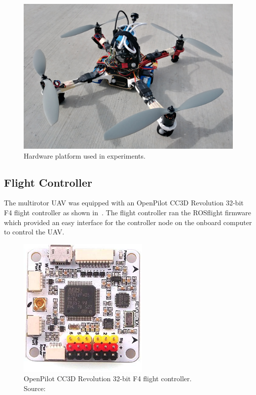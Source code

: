 \begin{figure}[htbp]
  \centering
  \includegraphics[scale=0.15]{figures/hardware_platform.jpg}
  \caption[Multirotor UAV Used in Experiments]{Hardware platform used in experiments.}
  \label{f:drone_pic}
\end{figure}

\subsection{Flight Controller}
The multirotor UAV was equipped with an OpenPilot CC3D Revolution 32-bit F4
flight controller as shown in~. The flight controller ran the
ROSflight firmware which provided an easy interface
for the controller node on the onboard computer to control the UAV.

\begin{figure}[htbp]
  \centering
  \includegraphics[width=2.5in]{figures/f4.jpg}
  \caption[OpenPilot CC3D Revolution 32-bit F4]{OpenPilot CC3D Revolution 32-bit
    F4 flight controller. \\ \hspace{\textwidth} Source:~\cite{openpilotrevo}
}
%
  \label{fig:f4}
\end{figure}

